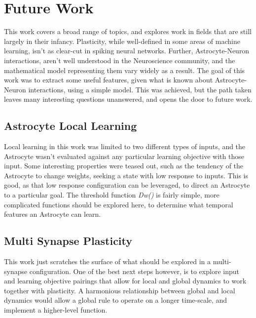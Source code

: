 %

\chapter{Future Work} \label{chapter:future-work}
This work covers a broad range of topics, and explores work in fields that are
still largely in their infancy. Plasticity, while well-defined in some areas of
machine learning, isn't as clear-cut in spiking neural networks. Further,
Astrocyte-Neuron interactions, aren't well understood in the Neuroscience
community, and the mathematical model representing them vary widely as a
result. The goal of this work was to extract some useful features, given what is
known about Astrocyte-Neuron interactions, using a simple model. This was
achieved, but the path taken leaves many interesting questions unanswered, and
opens the door to future work.

\section{Astrocyte Local Learning}
Local learning in this work was limited to two different types of inputs, and
the Astrocyte wasn't evaluated against any particular learning objective with
those input. Some interesting properties were teased out, such as the tendency of
the Astrocyte to change weights, seeking a state with low \ca response to
inputs. This is good, as that low \ca response configuration can be leveraged,
to direct an Astrocyte to a particular goal. The threshold function
\emph{Dw(\ca)} is fairly simple, more complicated functions should be explored
here, to determine what temporal features an Astrocyte can learn.

\section{Multi Synapse Plasticity}
This work just scratches the surface of what should be explored in a
multi-synapse configuration. One of the best next steps however, is to explore
input and learning objective pairings that allow for local and global dynamics
to work together with plasticity. A harmonious relationship between global and
local dynamics would allow a global rule to operate on a longer time-scale, and
implement a higher-level function.


